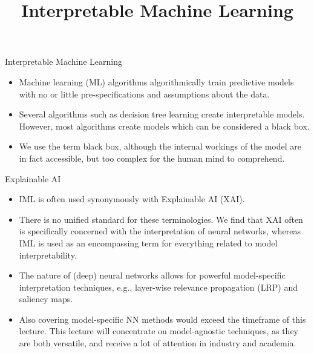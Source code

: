 \documentclass[11pt,compress,t,notes=noshow, aspectratio=169, xcolor=table]{beamer}
\title{Interpretable Machine Learning}
\date{}
\begin{document}
\newcommand{\titlefigure}{figure/open_blackbox}
\newcommand{\learninggoals}{
\item What is interpretable machine learning (IML) and Explainable Artificial Intelligence (XAI)?
\item What is interpretability?
\item What are the fundamental terms and concepts of IML?}


\begin{vbframe}{Interpretable Machine Learning}
\begin{itemize}
\itemsep2em
\item Machine learning (ML) algorithms algorithmically train predictive models with no or little pre-specifications and assumptions about the data.
\item Several algorithms such as decision tree learning create interpretable models. However, most algorithms create models which can be considered a black box.
\item We use the term black box, although the internal workings of the model are in fact accessible, but too complex for the human mind to comprehend.
\end{itemize}
\end{vbframe}

\begin{vbframe}{Explainable AI}
\begin{itemize}
\itemsep1em
\item IML is often used synonymously with Explainable AI (XAI). 
\item There is no unified standard for these terminologies. We find that XAI often is specifically concerned with the interpretation of neural networks, whereas IML is used as an encompassing term for everything related to model interpretability.
\item The nature of (deep) neural networks allows for powerful model-specific interpretation techniques, e.g., layer-wise relevance propagation (LRP) and saliency maps.
\item Also covering model-specific NN methods would exceed the timeframe of this lecture. This lecture will concentrate on model-agnostic techniques, as they are both versatile, and receive a lot of attention in industry and academia.
\end{itemize}
\end{vbframe}
\end{document}
